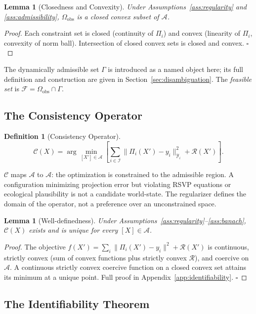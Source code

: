 \documentclass[12pt, oneside]{article}
\newtheorem{lemma}[theorem]{Lemma}
\newtheorem{definition}[theorem]{Definition}
\begin{document}
\begin{lemma}[Closedness and Convexity]
Under Assumptions~\ref{ass:regularity} and \ref{ass:admissibility},
$\Omega_{\mathrm{obs}}$ is a closed convex subset of $\mathcal{A}$.
\end{lemma}
\begin{proof}
Each constraint set is closed (continuity of $\Pi_i$) and convex (linearity of $\Pi_i$,
convexity of norm ball). Intersection of closed convex sets is closed and convex.
$\square$
\end{proof}

The dynamically admissible set $\Gamma$ is introduced as a named object here; its full
definition and construction are given in Section~\ref{sec:disambiguation}. The
\emph{feasible set} is $\mathcal{F} = \Omega_{\mathrm{obs}} \cap \Gamma$.

\subsection{The Consistency Operator}

\begin{definition}[Consistency Operator]
\[
\mathcal{C}(X) = \arg\min_{[X'] \in \mathcal{A}}
\left[ \sum_{i \in \mathcal{I}} \|\Pi_i(X') - y_i\|_{\mathcal{Y}_i}^2
+ \mathcal{R}(X') \right].
\]
\end{definition}

$\mathcal{C}$ maps $\mathcal{A}$ to $\mathcal{A}$: the optimization is constrained to the
admissible region. A configuration minimizing projection error but violating RSVP equations
or ecological plausibility is not a candidate world-state. The regularizer defines the
domain of the operator, not a preference over an unconstrained space.

\begin{lemma}[Well-definedness]
Under Assumptions~\ref{ass:regularity}--\ref{ass:banach}, $\mathcal{C}(X)$ exists and is
unique for every $[X] \in \mathcal{A}$.
\end{lemma}
\begin{proof}
The objective $f(X') = \sum_i \|\Pi_i(X') - y_i\|^2 + \mathcal{R}(X')$ is continuous,
strictly convex (sum of convex functions plus strictly convex $\mathcal{R}$), and coercive
on $\mathcal{A}$. A continuous strictly convex coercive function on a closed convex set
attains its minimum at a unique point. Full proof in Appendix~\ref{app:identifiability}.
$\square$
\end{proof}

\subsection{The Identifiability Theorem}
\end{document}
